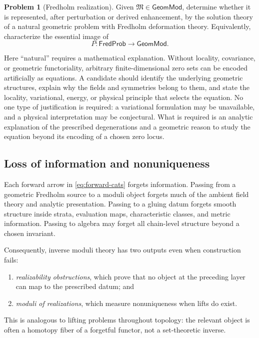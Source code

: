 \documentclass[11pt,letterpaper,twoside]{article}
\theoremstyle{plain}
\theoremstyle{definition}
\newtheorem{problem}[theorem]{Problem}
\theoremstyle{remark}
\newcommand{\GeomMod}{\mathsf{GeomMod}}
\newcommand{\FredProb}{\mathsf{FredProb}}
\begin{document}
\begin{problem}[Fredholm realization]\label{prob:i3}
Given \(\mathfrak M\in\GeomMod\), determine whether it is represented, after perturbation or derived enhancement, by the solution theory of a natural geometric problem with Fredholm deformation theory.  Equivalently, characterize the essential image of
\[
 P:\FredProb\longrightarrow\GeomMod.
\]
\end{problem}

Here ``natural'' requires a mathematical explanation.  Without locality, covariance, or geometric functoriality, arbitrary finite-dimensional zero sets can be encoded artificially as equations.  A candidate should identify the underlying geometric structures, explain why the fields and symmetries belong to them, and state the locality, variational, energy, or physical principle that selects the equation.  No one type of justification is required: a variational formulation may be unavailable, and a physical interpretation may be conjectural.  What is required is an analytic explanation of the prescribed degenerations and a geometric reason to study the equation beyond its encoding of a chosen zero locus.

\subsection{Loss of information and nonuniqueness}

Each forward arrow in \eqref{eq:forward-cats} forgets information.  Passing from a geometric Fredholm source to a moduli object forgets much of the ambient field theory and analytic presentation.  Passing to a gluing datum forgets smooth structure inside strata, evaluation maps, characteristic classes, and metric information.  Passing to algebra may forget all chain-level structure beyond a chosen invariant.

Consequently, inverse moduli theory has two outputs even when construction fails:
\begin{enumerate}
\item \emph{realizability obstructions}, which prove that no object at the preceding layer can map to the prescribed datum; and
\item \emph{moduli of realizations}, which measure nonuniqueness when lifts do exist.
\end{enumerate}
This is analogous to lifting problems throughout topology: the relevant object is often a homotopy fiber of a forgetful functor, not a set-theoretic inverse.
\end{document}
